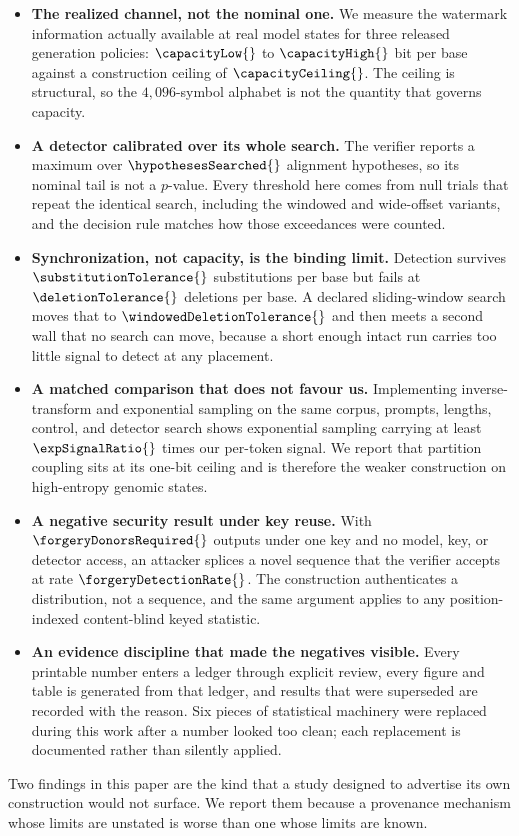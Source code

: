 \begin{itemize}
  \item \textbf{The realized channel, not the nominal one.} We measure the watermark information
  actually available at real model states for three released generation policies:
  $\capacityLow{}$ to $\capacityHigh{}$ bit per base against a construction ceiling of
  $\capacityCeiling{}$. The ceiling is structural, so the $4{,}096$-symbol alphabet is not the
  quantity that governs capacity.

  \item \textbf{A detector calibrated over its whole search.} The verifier reports a maximum over
  $\hypothesesSearched{}$ alignment hypotheses, so its nominal tail is not a $p$-value. Every
  threshold here comes from null trials that repeat the identical search, including the windowed and
  wide-offset variants, and the decision rule matches how those exceedances were counted.

  \item \textbf{Synchronization, not capacity, is the binding limit.} Detection survives
  $\substitutionTolerance{}$ substitutions per base but fails at $\deletionTolerance{}$ deletions per
  base. A declared sliding-window search moves that to $\windowedDeletionTolerance{}$ and then meets a
  second wall that no search can move, because a short enough intact run carries too little signal to
  detect at any placement.

  \item \textbf{A matched comparison that does not favour us.} Implementing inverse-transform and
  exponential sampling on the same corpus, prompts, lengths, control, and detector search shows
  exponential sampling carrying at least $\expSignalRatio{}$ times our per-token signal. We report
  that partition coupling sits at its one-bit ceiling and is therefore the weaker construction on
  high-entropy genomic states.

  \item \textbf{A negative security result under key reuse.} With
  $\forgeryDonorsRequired{}$ outputs under one key and no model, key, or detector access, an attacker
  splices a novel sequence that the verifier accepts at rate $\forgeryDetectionRate{}$. The
  construction authenticates a distribution, not a sequence, and the same argument applies to any
  position-indexed content-blind keyed statistic.

  \item \textbf{An evidence discipline that made the negatives visible.} Every printable number enters
  a ledger through explicit review, every figure and table is generated from that ledger, and results
  that were superseded are recorded with the reason. Six pieces of statistical machinery were replaced
  during this work after a number looked too clean; each replacement is documented rather than
  silently applied.
\end{itemize}

Two findings in this paper are the kind that a study designed to advertise its own construction would
not surface. We report them because a provenance mechanism whose limits are unstated is worse than one
whose limits are known.
